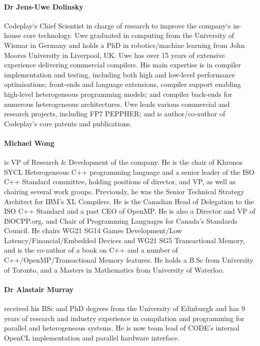 \documentclass[a4paper,11pt]{article}
\begin{document}
\paragraph{Dr Jens-Uwe Dolinsky} Codeplay`s Chief Scientist in charge of research to improve the company`s in-house core technology. Uwe graduated in computing from the University of Wismar in Germany and holds a PhD in robotics/machine learning from John Moores University in Liverpool, UK. Uwe has over 15 years of extensive experience delivering commercial compilers. His main expertise is in compiler implementation and testing, including both high and low-level performance optimisations; front-ends and language extensions, compiler support enabling high-level heterogeneous programming models; and compiler back-ends for numerous heterogeneous architectures. Uwe leads various commercial and research projects, including FP7 PEPPHER; and is author/co-author of Codeplay’s core patents and publications. 

\paragraph{Michael Wong}  is VP of Research \& Development of the company. He is the chair of Khronos SYCL Heterogeneous C++ programming language and a senior leader of the ISO C++ Standard committee, holding positions of director, and VP, as well as chairing several work groups. Previously, he was the Senior Technical Strategy Architect for IBM’s XL Compilers. He is the Canadian Head of Delegation to the ISO C++ Standard and a past CEO of OpenMP. He is also a Director and VP of ISOCPP.org, and Chair of Programming Languages for Canada’s Standards Council. He chairs WG21 SG14 Games Development/Low Latency/Financial/Embedded Devices and WG21 SG5 Transactional Memory, and is the co-author of a book on C++ and a number of C++/OpenMP/Transactional Memory features. He holds a B.Sc from University of Toronto, and a Masters in Mathematics from University of Waterloo.
\paragraph{Dr Alastair Murray} received his BSc and PhD degrees from the
University of Edinburgh and has 9 years of research and industry experience in compilation and programming for parallel and heterogeneous systems. He is now team lead of CODE's internal OpenCL implementation and parallel hardware interface.
\end{document}
